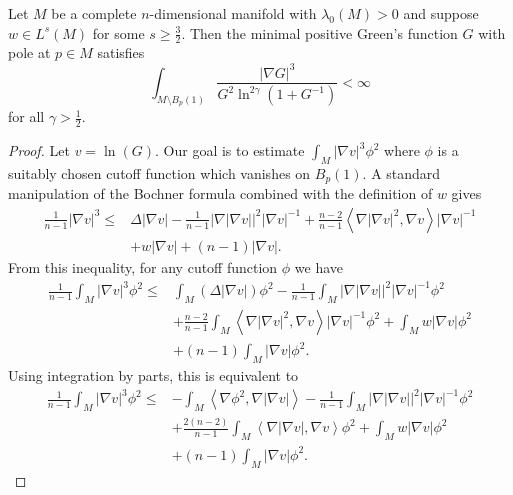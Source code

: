 \documentclass[10pt,a4paper]{amsart}
\begin{document}
\begin{lemma}
    Let $M$ be a complete $n$-dimensional manifold with $\lambda_0(M)>0$ and suppose $w\in L^s(M)$ for some $s\geq \frac{3}{2}$. Then the minimal positive Green's function $G$ with pole at $p\in M$ satisfies
    \begin{equation*}
    \int_{M\setminus B_p(1)} \frac{|\nabla G|^3}{G^2\ln^{2\gamma}(1+G^{-1})}<\infty
    \end{equation*}
    for all $\gamma > \frac{1}{2}$.
\end{lemma}

\begin{proof}

   Let $v = \ln(G)$. Our goal is to estimate $\int_M |\nabla v|^3\phi^2$ where $\phi$ is a suitably chosen cutoff function which vanishes on $B_p(1)$. A standard manipulation of the Bochner formula combined with the definition of $w$ gives 
\begin{align*}
\frac{1}{n-1}|\nabla v|^3\leq& \Delta |\nabla v|-\frac{1}{n-1}|\nabla |\nabla v||^2|\nabla v|^{-1}+\frac{n-2}{n-1}\left<\nabla |\nabla v|^2,\nabla v\right>|\nabla v|^{-1}\\
&+w|\nabla v|+(n-1)|\nabla v|.
\end{align*}
From this inequality, for any cutoff function $\phi$ we have
\begin{align*}
\frac{1}{n-1}\int_M |\nabla v|^3\phi^2 \leq &\int_M (\Delta |\nabla v|)\phi^2 - \frac{1}{n-1}\int_M |\nabla |\nabla v||^2|\nabla v|^{-1}\phi^2\\
&+\frac{n-2}{n-1}\int_M\left<\nabla |\nabla v|^2,\nabla v\right>|\nabla v|^{-1}\phi^2+\int_M w|\nabla v|\phi^2\\
&+(n-1)\int_M |\nabla v|\phi^2. 
\end{align*}
Using integration by parts, this is equivalent to
\begin{align*}
\frac{1}{n-1}\int_M |\nabla v|^3\phi^2\leq &-\int_M \left<\nabla \phi^2,\nabla |\nabla v|\right>- \frac{1}{n-1}\int_M |\nabla |\nabla v||^2|\nabla v|^{-1}\phi^2 \\
&+\frac{2(n-2)}{n-1}\int_M\left<\nabla |\nabla v|,\nabla v\right>\phi^2 +\int_M w|\nabla v|\phi^2\\
&+(n-1)\int_M|\nabla v|\phi^2.
\end{align*}


\end{proof}
\end{document}
